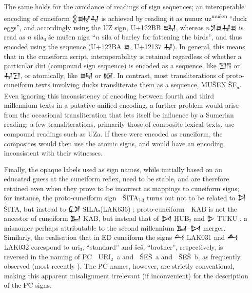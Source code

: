 The same holds for the avoidance of readings of sign sequences; an
interoperable encoding of cunei\-form {\oraccnoto 𒉭𒊻𒄷} is achieved by
reading it as nunuz uz\textsuperscript{mušen} “duck eggs”, and
accordingly using the UZ sign, U+122BB {\oraccnoto 𒊻}, whereas
$n${\oraccnoto 𒋡𒊺𒄷𒊺} is read as $n$ sila₃ še mušen niga
“$n$ sila of barley for fattening the birds”, and thus
encoded using the sequence (U+122BA {\oraccnoto 𒊺}, U+12137
{\oraccnoto 𒄷}). In general, this means that in the cuneiform script,
interoperability is retained regardless of whether a particular diri
(compound sign sequence) is encoded as a sequence, like {\oraccnoto
𒋛𒀀} or {\oraccnoto 𒄷𒋛}, or atomically, like {\oraccnoto 𒊻} or
{\oraccnoto 𒎏}. In contrast, most transliterations of proto-cuneiform
texts involving ducks transliterate them as a sequence, MUŠEN
ŠE\textsubscript{a}. Even ignoring this inconsistency of encoding
between fourth and third millennium texts in a putative unified
encoding, a further problem would arise from the occasional
transliteration that lets itself be influence by a Sumerian reading: a
few transliterations, primarily those of composite lexical texts, use
compound readings such as UZa. If these were encoded as cuneiform, the
composites would then use the atomic signs, and would have an encoding
inconsistent with their witnesses.

Finally, the opaque labels used as sign names, while initially based
on an educated guess at the cuneiform reflex, need to be stable, and
are therefore retained even when they prove to be incorrect as
mappings to cuneiform signs; for instance, the proto-cuneiform sign
{\oraccpc 𒩁} ŠITA\textsubscript{b3} turns out not to be related to
{\oraccnoto 𒋖} ŠITA, but instead to {\oraccnoto 𒔌}
SILAₓ(LAK636) \cite[220]{Wagensonner2016}; proto-cuneiform {\oraccpc
𒡱} KAB is not the ancestor of cuneiform {\oraccnoto 𒆏} KAB, but
instead that of {\oraccnoto 𒄸} ḪUB₂ and {\oraccnoto 𒌇}
TUKU \cite[274]{Wagensonner2016}, a misnomer perhaps attributable to
the second millennium {\oraccnoto 𒆏}–{\oraccnoto 𒄸} merger. Similarly,
the realisation that in ED cuneiform the signs {\oraccnoto 𒌶} LAK031
and {\oraccnoto 𒋀} LAK032 corespond to uri₃, ``standard'' and šeš,
``brother'', respectively, is reversed in the naming of PC {\oraccpc
𒫔} URI₃~a and {\oraccpc 𒨲} ŠEŠ~a and {\oraccpc 𒨳} ŠEŠ~b, as frequently
observed (most recently \cite[154-158]{Selz2025}). The PC names,
however, are strictly conventional, making this apparent misalignment
irrelevant (if inconvenient) for the description of the PC signs.

